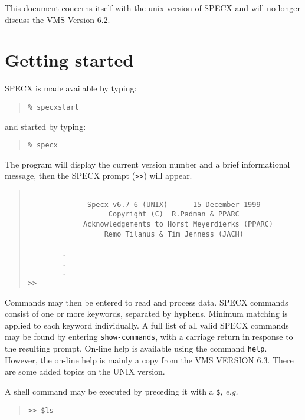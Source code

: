 \documentclass[twoside,11pt]{article}
\renewcommand{\_}{\texttt{\symbol{95}}}
\newenvironment{myquote}{\begin{quote}\begin{small}}{\end{small}\end{quote}}
\begin{document}
This document concerns itself with the unix version of SPECX and will
no longer discuss the VMS Version 6.2.

\section {Getting started}

SPECX is made available by typing:
\begin{myquote}
\begin{verbatim}
% specxstart
\end{verbatim}
\end{myquote}
and started by typing:
\begin{myquote}
\begin{verbatim}
% specx 
\end{verbatim}
\end{myquote}
The program will display the current version number and
a brief informational message, then the SPECX prompt ({\tt>>}) will appear.

\begin{myquote}
\begin{verbatim}
            --------------------------------------------
              Specx v6.7-6 (UNIX) ---- 15 December 1999
                   Copyright (C)  R.Padman & PPARC
             Acknowledgements to Horst Meyerdierks (PPARC)
                  Remo Tilanus & Tim Jenness (JACH)
            --------------------------------------------
        .
        .
        .
>> 
\end{verbatim}
\end{myquote}

Commands may then be entered to read and process data.
SPECX commands consist of one or more keywords, separated
by hyphens. Minimum matching is applied to each keyword
individually. A full list of all valid SPECX commands
may be found by entering {\tt show-commands}, with a carriage return
in response to the resulting prompt. On-line help is available
using the command {\tt help}. However, the on-line help is mainly a copy
from the VMS VERSION 6.3. There are some added topics on the UNIX version.

A shell command may be executed by preceding it with a {\tt \$}, {\em e.g.}

\begin{myquote}
\begin{verbatim}
>> $ls
\end{verbatim}
\end{myquote}
\end{document}
